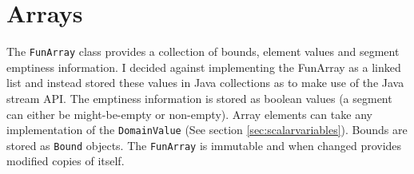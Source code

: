 \documentclass{report}
\begin{document}
\section{Arrays}

The \texttt{FunArray} class provides a collection of bounds, element values and segment emptiness information. I decided against implementing the FunArray as a linked list and instead stored these values in Java collections as to make use of the Java stream API. The emptiness information is stored as boolean values (a segment can either be might-be-empty or non-empty). Array elements can take any implementation of the \texttt{DomainValue} (See section \ref{sec:scalarvariables}). Bounds are stored as \texttt{Bound} objects. The \texttt{FunArray} is immutable and when changed provides modified copies of itself.
\end{document}
